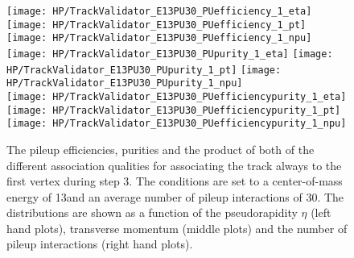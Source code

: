 \begin{figure}[Ht]
  \centering
  \texttt{[image: HP/TrackValidator\_E13PU30\_PUefficiency\_1\_eta]}
  \texttt{[image: HP/TrackValidator\_E13PU30\_PUefficiency\_1\_pt]}
  \texttt{[image: HP/TrackValidator\_E13PU30\_PUefficiency\_1\_npu]}
   \\
  \texttt{[image: HP/TrackValidator\_E13PU30\_PUpurity\_1\_eta]}
  \texttt{[image: HP/TrackValidator\_E13PU30\_PUpurity\_1\_pt]}
  \texttt{[image: HP/TrackValidator\_E13PU30\_PUpurity\_1\_npu]}
   \\
  \texttt{[image: HP/TrackValidator\_E13PU30\_PUefficiencypurity\_1\_eta]}
  \texttt{[image: HP/TrackValidator\_E13PU30\_PUefficiencypurity\_1\_pt]}
  \texttt{[image: HP/TrackValidator\_E13PU30\_PUefficiencypurity\_1\_npu]}
  \caption[Pileup efficiencies, purities and their product of the different qualities of the association map with associating the track always to the first vertex during step 3 with 13\TeV and $\left<PU\right>=30$]{The pileup efficiencies, purities and the product of both of the different association qualities for associating the track always to the first vertex during step 3. The conditions are set to a center-of-mass energy of 13\TeV and an average number of pileup interactions of 30. The distributions are shown as a function of the pseudorapidity $\eta$ (left hand plots), transverse momentum (middle plots) and the number of pileup interactions (right hand plots). \label{plot:HPUTAE13PU30ZtomumuQualPU1}}
\end{figure}

